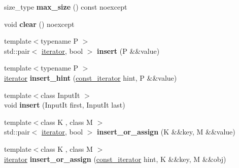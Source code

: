 \begin{DoxyCompactItemize}
size\+\_\+type {\bfseries max\+\_\+size} () const noexcept
\item 
\mbox{\label{classtsl_1_1detail__ordered__hash_1_1ordered__hash_ac55d51b91489e765945297b37da6c462}} 
void {\bfseries clear} () noexcept
\item 
\mbox{\label{classtsl_1_1detail__ordered__hash_1_1ordered__hash_ad0d6131e5d08cdaf625371368a467202}} 
{\footnotesize template$<$typename P $>$ }\\std\+::pair$<$ \mbox{\hyperlink{classtsl_1_1detail__ordered__hash_1_1ordered__hash_1_1ordered__iterator}{iterator}}, bool $>$ {\bfseries insert} (P \&\&value)
\item 
\mbox{\label{classtsl_1_1detail__ordered__hash_1_1ordered__hash_a71a2ff21a5f525dc7b5789da5103af34}} 
{\footnotesize template$<$typename P $>$ }\\\mbox{\hyperlink{classtsl_1_1detail__ordered__hash_1_1ordered__hash_1_1ordered__iterator}{iterator}} {\bfseries insert\+\_\+hint} (\mbox{\hyperlink{classtsl_1_1detail__ordered__hash_1_1ordered__hash_1_1ordered__iterator}{const\+\_\+iterator}} hint, P \&\&value)
\item 
\mbox{\label{classtsl_1_1detail__ordered__hash_1_1ordered__hash_a05718b0e6ee94a6ef1519a457b093f74}} 
{\footnotesize template$<$class Input\+It $>$ }\\void {\bfseries insert} (Input\+It first, Input\+It last)
\item 
\mbox{\label{classtsl_1_1detail__ordered__hash_1_1ordered__hash_a6511c0204e01e225609361850fad2a41}} 
{\footnotesize template$<$class K , class M $>$ }\\std\+::pair$<$ \mbox{\hyperlink{classtsl_1_1detail__ordered__hash_1_1ordered__hash_1_1ordered__iterator}{iterator}}, bool $>$ {\bfseries insert\+\_\+or\+\_\+assign} (K \&\&key, M \&\&value)
\item 
\mbox{\label{classtsl_1_1detail__ordered__hash_1_1ordered__hash_ac3a4ec1dc1dae48d7a60b06075eb2bbf}} 
{\footnotesize template$<$class K , class M $>$ }\\\mbox{\hyperlink{classtsl_1_1detail__ordered__hash_1_1ordered__hash_1_1ordered__iterator}{iterator}} {\bfseries insert\+\_\+or\+\_\+assign} (\mbox{\hyperlink{classtsl_1_1detail__ordered__hash_1_1ordered__hash_1_1ordered__iterator}{const\+\_\+iterator}} hint, K \&\&key, M \&\&obj)

\end{DoxyCompactItemize}
